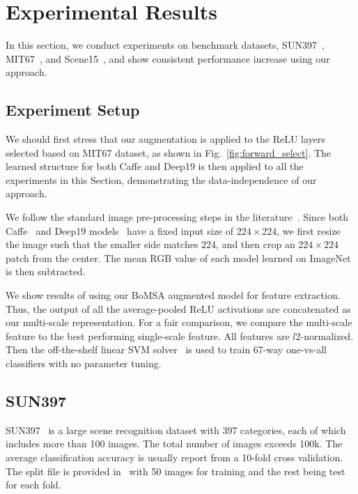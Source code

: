 \documentclass[10pt,twocolumn,letterpaper]{article}
\begin{document}
\section{Experimental Results\label{sec:exp}}

In this section, we conduct experiments on benchmark datasets, SUN397~\cite{SUN397}, MIT67~\cite{MIT67}, and Scene15~\cite{Scene15}, and show consistent performance increase using our approach. 

\subsection{Experiment Setup}

We should first stress that our augmentation is applied to the ReLU layers selected based on MIT67 dataset, as shown in Fig.~\ref{fig:forward_select}. The learned structure for both Caffe and Deep19 is then applied to all the experiments in this Section, demonstrating the data-independence of our approach. 

We follow the standard image pre-processing steps in the literature~\cite{AlexNet,Caffe,veryDeep}. Since both Caffe~\cite{Caffe} and Deep19 models~\cite{veryDeep} have a fixed input size of $224\times 224$, we first resize the image such that the smaller side matches $224$, and then crop an $224\times 224$ patch from the center. The mean RGB value of each model learned on ImageNet~\cite{ImageNet} is then subtracted.  

We show results of using our BoMSA augmented model for feature extraction. Thus, the output of all the average-pooled ReLU activations are concatenated as our multi-scale representation. For a fair comparison, we compare the multi-scale feature to the best performing single-scale feature. All features are $l2$-normalized. Then the off-the-shelf linear SVM solver~\cite{liblinear} is used to train 67-way one-vs-all classifiers with no parameter tuning.


\subsection{SUN397}

SUN397~\cite{SUN397} is a large scene recognition dataset with 397 categories, each of which includes more than 100 images. The total number of images exceeds 100k. The average classification accuracy is usually report from a 10-fold cross validation. The split file is provided in~\cite{SUN397} with 50 images for training and the rest being test for each fold.  
\end{document}
